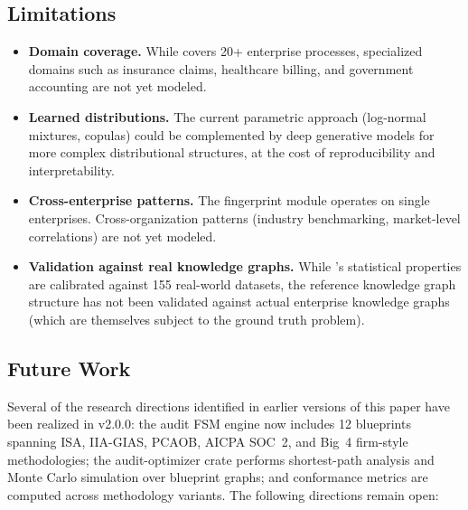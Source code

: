 \subsection{Limitations}
\label{sec:limitations}

\begin{itemize}
  \item \textbf{Domain coverage.}  While \system{} covers 20+ enterprise
    processes, specialized domains such as insurance claims, healthcare
    billing, and government accounting are not yet modeled.

  \item \textbf{Learned distributions.}  The current parametric approach
    (log-normal mixtures, copulas) could be complemented by deep
    generative models for more complex distributional structures, at
    the cost of reproducibility and interpretability.

  \item \textbf{Cross-enterprise patterns.}  The fingerprint module
    operates on single enterprises.  Cross-organization patterns
    (industry benchmarking, market-level correlations) are not yet
    modeled.

  \item \textbf{Validation against real knowledge graphs.}  While
    \system{}'s statistical properties are calibrated against 155
    real-world datasets, the reference knowledge graph structure
    has not been validated against actual enterprise knowledge graphs
    (which are themselves subject to the ground truth problem).
\end{itemize}

\subsection{Future Work}
\label{sec:future_work}

Several of the research directions identified in earlier versions of
this paper have been realized in v2.0.0: the audit FSM engine now
includes 12 blueprints spanning ISA, IIA-GIAS, PCAOB, AICPA SOC~2,
and Big~4 firm-style methodologies; the audit-optimizer crate performs
shortest-path analysis and Monte Carlo simulation over blueprint
graphs; and conformance metrics are computed across methodology
variants.  The following directions remain open:

